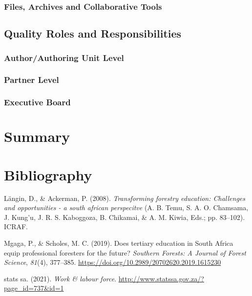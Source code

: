 \documentclass[
  11pt,
]{article}
\newlength{\cslhangindent}
\newenvironment{CSLReferences}[2] %
 {%
  \setlength{\parindent}{0pt}
  \ifodd #1 \everypar{\setlength{\hangindent}{\cslhangindent}}\ignorespaces\fi
  \ifnum #2 > 0
  \setlength{\parskip}{#2\baselineskip}
  \fi
 }%
 {}
\begin{document}
\hypertarget{files-archives-and-collaborative-tools}{%
\subsubsection{Files, Archives and Collaborative
Tools}\label{files-archives-and-collaborative-tools}}

\hypertarget{quality-roles-and-responsibilities}{%
\subsection{Quality Roles and
Responsibilities}\label{quality-roles-and-responsibilities}}

\hypertarget{authorauthoring-unit-level}{%
\subsubsection{Author/Authoring Unit
Level}\label{authorauthoring-unit-level}}

\hypertarget{partner-level}{%
\subsubsection{Partner Level}\label{partner-level}}

\hypertarget{executive-board}{%
\subsubsection{Executive Board}\label{executive-board}}

\clearpage

\hypertarget{summary}{%
\section{Summary}\label{summary}}

\clearpage

\hypertarget{bibliography}{%
\section{Bibliography}\label{bibliography}}

\hypertarget{refs}{}
\begin{CSLReferences}{1}{0}
\leavevmode{}%
Längin, D., \& Ackerman, P. (2008). \emph{Transforming forestry
education: Challenges and opportunities - a south african perspecitve}
(A. B. Temu, S. A. O. Chamsama, J. Kung'u, J. R. S. Kaboggoza, B.
Chikamai, \& A. M. Kiwia, Eds.; pp. 83--102). ICRAF.

\leavevmode{}%
Mgaga, P., \& Scholes, M. C. (2019). Does tertiary education in {South
Africa} equip professional foresters for the future? \emph{Southern
Forests: A Journal of Forest Science}, \emph{81}(4), 377--385.
\url{https://doi.org/10.2989/20702620.2019.1615230}

\leavevmode{}%
stats sa. (2021). \emph{Work \& labour force}.
\url{http://www.statssa.gov.za/?page_id=737\&id=1}

\end{CSLReferences}
\end{document}
